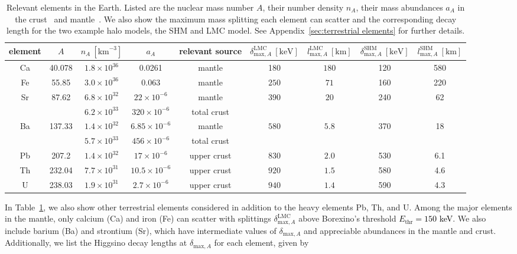 \documentclass[aps,prd,amsmath,amssymb,10pt,letterpaper,balancelastpage,showpacs,superscriptaddress,nofootinbib,floatfix,notitlepage,longbibliography,twocolumn
]{revtex4-2}
\newcommand{\numcolor}[1]{\textcolor{black}{#1}}
\newcommand{\deltamaxA}{\delta_{\text{max},A}}
\newcommand{\deltamaxALMC}{\delta^{\text{LMC}}_{\text{max},A}}
\newcommand{\deltamaxASHM}{\delta^{\text{SHM}}_{\text{max},A}}
\newcommand{\lmaxALMC}{l^{\text{LMC}}_{\text{max},A}}
\newcommand{\lmaxASHM}{l^{\text{SHM}}_{\text{max},A}}
\newcommand{\Ethr}{E_{\text{thr}}}
\begin{document}
\begin{table}[htpb!]
    \centering
    \begin{tabular}{|c|c|c|c|c|c|c|c|c|} \hline 
         element&   $A$&$n_A~[\text{km}^{-3}]$&  $a_A$& relevant source& $\deltamaxALMC~[\text{keV}]$&$\lmaxALMC~[\text{km}]$ & $\deltamaxASHM~[\text{keV}]$&$\lmaxASHM~[\text{km}]$\\ \hline 
 Ca& 40.078& $1.8 \times 10^{36}$& 0.0261& mantle& 180& $ 180$& 120&580\\\hline 
         Fe&   55.85&$3.0 \times 10^{36}$&  0.063&  mantle& $ 250$&$71$& 160&220\\ \hline 
 \multirow{2}{*}{Sr}&  \multirow{2}{*}{87.62}& $6.8 \times 10^{32}$& $22 \times 10^{-6}$& mantle&  \multirow{2}{*}{$390$}&  \multirow{2}{*}{$ 20$}&  \multirow{2}{*}{240}&  \multirow{2}{*}{62}\\ \cline{3-5} 
 & & $6.2 \times 10^{33}$& $320 \times 10^{-6}$& total crust& & & &\\ \hline 
  \multirow{2}{*}{Ba} &  \multirow{2}{*}{137.33} & $1.4 \times 10^{32}$& $6.85 \times 10^{-6}$& mantle&  \multirow{2}{*}{$ 580$}&  \multirow{2}{*}{$ 5.8$}&  \multirow{2}{*}{370}&  \multirow{2}{*}{18}\\ \cline{3-5}
 & & $5.7 \times 10^{33}$& $456 \times 10^{-6}$& total crust& & & &\\ \hline
         Pb&   207.2&$1.4 \times 10^{32}$&  $17 \times 10^{-6}$& upper crust & $ 830$&$2.0$& 530&6.1\\\hline 
         Th&   232.04&$7.7 \times 10^{31}$&  $10.5 \times 10^{-6}$& upper crust & $ 920$&$1.5$& 580&4.6\\ \hline 
         U&   238.03&$1.9 \times 10^{31}$&  $2.7 \times 10^{-6}$& upper crust & $ 940$&$ 1.4$& 590&4.3\\ \hline
    \end{tabular}
\caption{Relevant elements in the Earth. Listed are the nuclear mass number $A$, their number density $n_A$, their mass abundances $a_A$ in the crust~\cite{Composition_Crust} and mantle~\cite{Mantle_Composition}. We also show the maximum mass splitting each element can scatter and the corresponding decay length for the two example halo models, the SHM and LMC model. See Appendix~\ref{sec:terrestrial elements} for further details.}
    \label{tab: elements}
\end{table}
In Table~\ref{tab: elements}, we also show other terrestrial elements considered in addition to the heavy elements Pb, Th, and U. 
Among the major elements in the mantle, only calcium (Ca) and iron (Fe) can scatter with splittings $\deltamaxALMC$ above Borexino's threshold \numcolor{$\Ethr=150$ keV}. We also include barium (Ba) and strontium (Sr), which have intermediate values of $\deltamaxA$ and appreciable abundances in the mantle and crust. Additionally, we list the Higgsino decay lengths at $\deltamaxA$ for each element, given by
\end{document}
